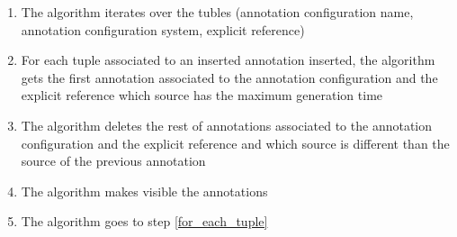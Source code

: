 \begin{enumerate}

\item The algorithm iterates over the tubles (annotation configuration name, annotation configuration system, explicit reference)
\item \label{for_each_tuple} For each tuple associated to an inserted annotation inserted, the algorithm gets the first annotation associated to the annotation configuration and the explicit reference which source has the maximum generation time
\item The algorithm deletes the rest of annotations associated to the annotation configuration and the explicit reference and which source is different than the source of the previous annotation
\item The algorithm makes visible the annotations
\item The algorithm goes to step \ref{for_each_tuple}
\end{enumerate}


